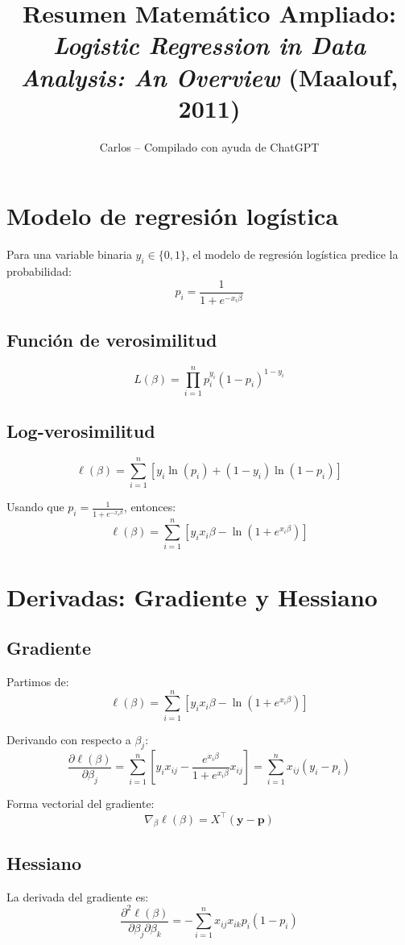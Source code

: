 \documentclass[12pt]{article}
\title{Resumen Matemático Ampliado: \textit{Logistic Regression in Data Analysis: An Overview} (Maalouf, 2011)}
\author{Carlos – Compilado con ayuda de ChatGPT}
\date{}
\begin{document}
\maketitle

\section*{Modelo de regresión logística}

Para una variable binaria $y_i \in \{0,1\}$, el modelo de regresión logística predice la probabilidad:
\[
    p_i = \frac{1}{1 + e^{-x_i \beta}}
\]

\subsection*{Función de verosimilitud}
\[
    L(\beta) = \prod_{i=1}^n p_i^{y_i} (1 - p_i)^{1 - y_i}
\]

\subsection*{Log-verosimilitud}
\[
    \ell(\beta) = \sum_{i=1}^n \left[ y_i \ln(p_i) + (1 - y_i) \ln(1 - p_i) \right]
\]

Usando que $p_i = \frac{1}{1 + e^{-x_i \beta}}$, entonces:
\[
    \ell(\beta) = \sum_{i=1}^n \left[ y_i x_i \beta - \ln(1 + e^{x_i \beta}) \right]
\]

\section*{Derivadas: Gradiente y Hessiano}

\subsection*{Gradiente}
Partimos de:
\[
    \ell(\beta) = \sum_{i=1}^n \left[ y_i x_i \beta - \ln(1 + e^{x_i \beta}) \right]
\]

Derivando con respecto a $\beta_j$:
\[
    \frac{\partial \ell(\beta)}{\partial \beta_j} = \sum_{i=1}^n \left[ y_i x_{ij} - \frac{e^{x_i \beta}}{1 + e^{x_i \beta}} x_{ij} \right] = \sum_{i=1}^n x_{ij}(y_i - p_i)
\]

Forma vectorial del gradiente:
\[
    \nabla_\beta \ell(\beta) = X^\top (\mathbf{y} - \mathbf{p})
\]

\subsection*{Hessiano}
La derivada del gradiente es:
\[
    \frac{\partial^2 \ell(\beta)}{\partial \beta_j \partial \beta_k} = - \sum_{i=1}^n x_{ij} x_{ik} p_i (1 - p_i)
\]
\end{document}
